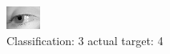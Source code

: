 \begin{figure}[h!]
\begin{center}
\includegraphics[width=0.60\columnwidth]{figures/ID2884_class_3_target_4.png}
\end{center}
\caption{ Classification: 3 actual target: 4}
\label{fig:ID2884_class_3_target_4}
\end{figure}
